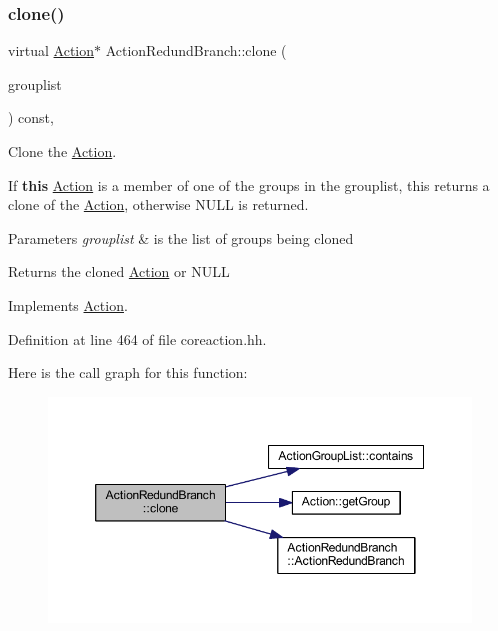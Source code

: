 \subsubsection{\texorpdfstring{clone()}{clone()}}
{\footnotesize\ttfamily virtual \mbox{\hyperlink{class_action}{Action}}$\ast$ Action\+Redund\+Branch\+::clone (\begin{DoxyParamCaption}\item[{const \mbox{\hyperlink{class_action_group_list}{Action\+Group\+List}} \&}]{grouplist }\end{DoxyParamCaption}) const\hspace{0.3cm}{\ttfamily [inline]}, {\ttfamily [virtual]}}



Clone the \mbox{\hyperlink{class_action}{Action}}. 

If {\bfseries{this}} \mbox{\hyperlink{class_action}{Action}} is a member of one of the groups in the grouplist, this returns a clone of the \mbox{\hyperlink{class_action}{Action}}, otherwise N\+U\+LL is returned. 
\begin{DoxyParams}{Parameters}
{\em grouplist} & is the list of groups being cloned \\
\hline
\end{DoxyParams}
\begin{DoxyReturn}{Returns}
the cloned \mbox{\hyperlink{class_action}{Action}} or N\+U\+LL 
\end{DoxyReturn}


Implements \mbox{\hyperlink{class_action_af8242e41d09e5df52f97df9e65cc626f}{Action}}.



Definition at line 464 of file coreaction.\+hh.

Here is the call graph for this function\+:
\nopagebreak
\begin{figure}[H]
\begin{center}
\leavevmode
\includegraphics[width=350pt]{class_action_redund_branch_a116163afe83810fd44a1137ee040718a_cgraph}
\end{center}
\end{figure}


